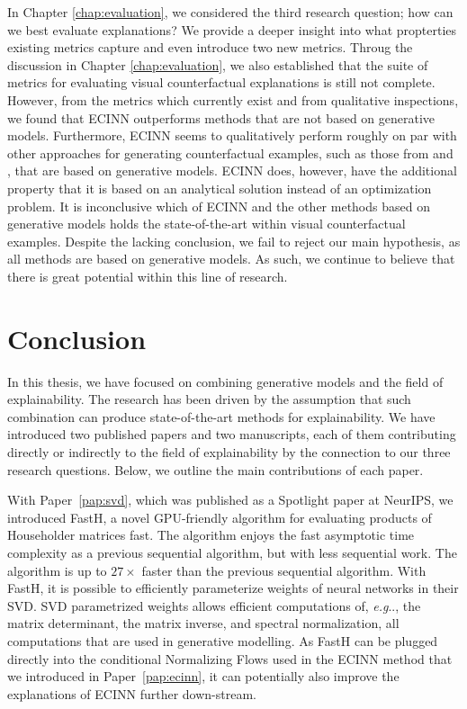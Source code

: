 \documentclass[11pt,a4paper,twoside,openright,final]{memoir}
\makeatletter
\DeclareRobustCommand\onedot{\futurelet\@let@token\@onedot}
\def\@onedot{\ifx\@let@token.\else.\null\fi\xspace}
\def\eg{\emph{e.g}\onedot} \def\Eg{\emph{E.g}\onedot}
\newcommand*{\paperref}[1]{Paper~\hyperref[#1]{\ref{#1}}}
\makeatother
\begin{document}
In Chapter \ref{chap:evaluation}, we considered the third research question; how can we best evaluate explanations?
We provide a deeper insight into what propterties existing metrics capture and even introduce two new metrics.  
Throug the discussion in Chapter \ref{chap:evaluation}, we also established that the suite of metrics for evaluating visual counterfactual explanations is still not complete.
However, from the metrics which currently exist and from qualitative inspections, we found that ECINN outperforms methods that are not based on generative models.
Furthermore, ECINN seems to qualitatively perform roughly on par with other approaches for generating counterfactual examples, such as those from \citet{Singla2019} and \citet{Rodriguez2021}, that are based on generative models. 
ECINN does, however, have the additional property that it is based on an analytical solution instead of an optimization problem. 
It is inconclusive which of ECINN and the other methods based on generative models holds the state-of-the-art within visual counterfactual examples.
Despite the lacking conclusion, we fail to reject our main hypothesis, as all methods are based on generative models.
As such, we continue to believe that there is great potential within this line of research.


\section{Conclusion}\label{sec:conclusion-conclusion}
In this thesis, we have focused on combining generative models and the field of explainability.
The research has been driven by the assumption that such combination can produce state-of-the-art methods for explainability. 
We have introduced two published papers and two manuscripts, each of them contributing directly or indirectly to the field of explainability by the connection to our three research questions. 
Below, we outline the main contributions of each paper.

With \paperref{pap:svd}, which was published as a Spotlight paper at NeurIPS, we introduced FastH, a novel GPU-friendly algorithm for evaluating products of Householder matrices fast.
The algorithm enjoys the fast asymptotic time complexity as a previous sequential algorithm, but with less sequential work.
The algorithm is up to $27\times$ faster than the previous sequential algorithm.
With FastH, it is possible to efficiently parameterize weights of neural networks in their SVD.
SVD parametrized weights allows efficient computations of, \eg, the matrix determinant, the matrix inverse, and spectral normalization, all computations that are used in generative modelling. 
As FastH can be plugged directly into the conditional Normalizing Flows used in the ECINN method that we introduced in \paperref{pap:ecinn}, it can potentially also improve the explanations of ECINN further down-stream.
\end{document}
